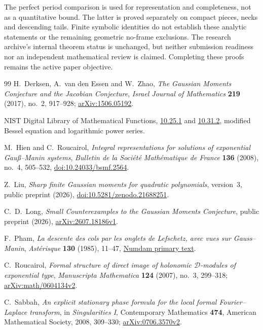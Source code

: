 \documentclass[11pt]{article}
\theoremstyle{definition}\newtheorem{definition}[theorem]{Definition}
\theoremstyle{remark}\newtheorem{remark}[theorem]{Remark}
\begin{document}
The perfect period comparison is used for representation and
completeness, not as a quantitative bound. The latter is proved
separately on compact pieces, necks and descending tails. Finite
symbolic identities do not establish these analytic statements or
the remaining geometric no-frame exclusions. The research archive's
internal theorem status is unchanged, but neither
submission readiness nor an independent mathematical review is claimed.
Completing these proofs remains the active paper objective.

\clearpage
\begin{thebibliography}{99}
H.~Derksen, A.~van den Essen and W.~Zhao,
\emph{The Gaussian Moments Conjecture and the Jacobian Conjecture},
\emph{Israel Journal of Mathematics} \textbf{219} (2017), no.~2,
917--928; \href{https://arxiv.org/abs/1506.05192}{arXiv:1506.05192}.

NIST Digital Library of Mathematical Functions,
\href{https://dlmf.nist.gov/10.25.E1}{10.25.1} and
\href{https://dlmf.nist.gov/10.31.E2}{10.31.2},
modified Bessel equation and logarithmic power series.

M.~Hien and C.~Roucairol, \emph{Integral representations for solutions
of exponential Gau\ss--Manin systems},
\emph{Bulletin de la Soci\'et\'e Math\'ematique de France}
\textbf{136} (2008), no.~4, 505--532,
\href{https://doi.org/10.24033/bsmf.2564}{doi:10.24033/bsmf.2564}.

Z.~Liu, \emph{Sharp finite Gaussian moments for quadratic polynomials},
version~3, public preprint (2026),
\href{https://doi.org/10.5281/zenodo.21688251}{doi:10.5281/zenodo.21688251}.

C.~D.~Long, \emph{Small Counterexamples to the Gaussian Moments Conjecture},
public preprint (2026),
\href{https://arxiv.org/abs/2607.18186v1}{arXiv:2607.18186v1}.

F.~Pham, \emph{La descente des cols par les onglets de Lefschetz,
avec vues sur Gauss--Manin}, \emph{Ast\'erisque} \textbf{130}
(1985), 11--47,
\href{https://numdam.org/item/AST_1985__130__11_0/}{Numdam primary text}.

C.~Roucairol, \emph{Formal structure of direct image of holonomic
$\mathcal D$-modules of exponential type},
\emph{Manuscripta Mathematica} \textbf{124} (2007), no.~3, 299--318;
\href{https://arxiv.org/abs/math/0604134v2}{arXiv:math/0604134v2}.

C.~Sabbah, \emph{An explicit stationary phase formula for the local
formal Fourier--Laplace transform}, in \emph{Singularities I},
Contemporary Mathematics \textbf{474}, American Mathematical Society,
2008, 309--330;
\href{https://arxiv.org/abs/0706.3570v2}{arXiv:0706.3570v2}.


\end{thebibliography}
\end{document}
